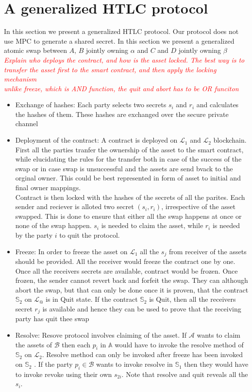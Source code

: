 \documentclass[manuscript,screen,review]{acmart}
\newcommand{\com}[1]{\textcolor{red}{\textit{#1}}}
\begin{document}
\section{A generalized HTLC protocol}
In this section we present a generalized HTLC protocol. Our protocol does not use MPC to generate a shared secret. 
In this section we present a generalized atomic swap between $A$, $B$ jointly owning $\alpha$ and $C$ and $D$ jointly owning $\beta$\\
\com{Explain who deploys the contract, and how is the asset locked. The best way is to transfer the asset first to the smart contract, and then apply the locking mechanism}\\
\com{unlike freeze, which is \textit{AND} function, the quit and abort has to be \textit{OR} funciton}
\begin{itemize}
	\item Exchange of hashes: Each party selects two secrets $s_i$ and $r_i$ and calculates the hashes of them. These hashes are exchanged over the secure private channel
	\item Deployment of the contract: A contract is deployed on $\mathcal{L}_1$ and $\mathcal{L}_2$ blockchain. First all the parties tranfer the ownership of the asset to the smart contract, while elucidating the rules for the transfer both in case of the success of the swap or in case swap is unsuccessful and the assets are send bvack to the orginal owner. This could be best represented in form of asset to initial and final owner mappings. \\
	Contract is then locked with the hashes of the secrets of all the parites. Each sender and reciever is alloted two secret $(s_i, r_i)$, irrespective of the asset swapped. This is done to ensure that either all the swap happens at once or none of the swap happen. $s_i$ is needed to claim the asset, while $r_i$ is needed by the party $i$ to quit the protocol.
	\item Freeze: In order to freeze the asset on $\mathcal{L}_1$ all the $s_j$ from receiver of the assets should be provided. All the receiver would freeze the contract one by one. Once all the receivers secrets are available, contract would be frozen. Once frozen, the sender cannot revert back and forfeit the swap. They can although abort the swap, but that can only be done once it is proven, that the contract $\mathbb{S}_2$ on $\mathcal{L}_@$ is in Quit state. If the contract $\mathbb{S}_2$  is Quit, then all the receivers secret $r_j$ is available and hence they can be used to prove that the receiving party has quit thee swap
	\item Resolve: Resove protocol involves claiming of the asset. If $\mathcal{A}$ wants to claim the assets of $\mathcal{B}$ then each $p_i$ in $\mathbb{A}$ would have to invoke the resolve method of $\mathbb{S}_2$ on $\mathcal{L}_2$. Resolve method can only be invoked after freeze has been invoked on $\mathbb{S}_2$ . If the party $p_i \in \mathcal{B}$ wants to invoke resolve in $\mathbb{S}_1$ then they would have to invoke revoke using their own $s_{2i}$. Note that resolve and quit reveals all the $s_i$.
	

\end{itemize}
\end{document}
